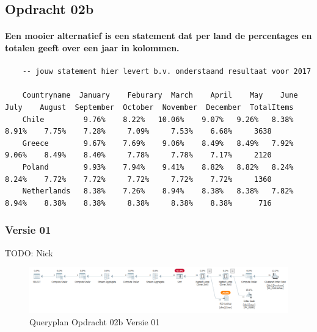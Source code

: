\subsection{Opdracht 02b}

\paragraph{
Een mooier alternatief is een statement dat per land de percentages en totalen geeft over een jaar in kolommen.
}

\begin{lstlisting}
    -- jouw statement hier levert b.v. onderstaand resultaat voor 2017

    Countryname  January	Feburary  March    April    May    June    July    August  September  October  November  December  TotalItems
    Chile         9.76%    8.22%   10.06%    9.07%   9.26%   8.38%   8.91%    7.75%    7.28%     7.09%     7.53%    6.68%     3638
    Greece        9.67%    7.69%    9.06%    8.49%   8.49%   7.92%   9.06%    8.49%    8.40%     7.78%     7.78%    7.17%     2120
    Poland        9.93%    7.94%    9.41%    8.82%   8.82%   8.24%   8.24%    7.72%    7.72%     7.72%     7.72%    7.72%     1360
    Netherlands   8.38%    7.26%    8.94%    8.38%   8.38%   7.82%   8.94%    8.38%    8.38%     8.38%     8.38%    8.38%      716
\end{lstlisting}

\subsubsection{Versie 01}
TODO: Nick

\begin{figure}[H]
    \centering
    \includegraphics[width=1\textwidth]{image/nick/opdracht-02b.PNG}
    \caption{Queryplan Opdracht 02b Versie 01}
\end{figure}

